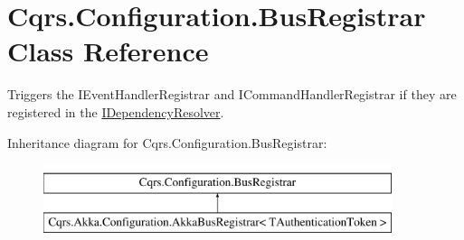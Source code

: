 \hypertarget{classCqrs_1_1Configuration_1_1BusRegistrar}{}\section{Cqrs.\+Configuration.\+Bus\+Registrar Class Reference}
\label{classCqrs_1_1Configuration_1_1BusRegistrar}


Triggers the I\+Event\+Handler\+Registrar and I\+Command\+Handler\+Registrar if they are registered in the \hyperlink{interfaceCqrs_1_1Configuration_1_1IDependencyResolver}{I\+Dependency\+Resolver}.  


Inheritance diagram for Cqrs.\+Configuration.\+Bus\+Registrar\+:\begin{figure}[H]
\begin{center}
\leavevmode
\includegraphics[height=2.000000cm]{classCqrs_1_1Configuration_1_1BusRegistrar}
\end{center}
\end{figure}
